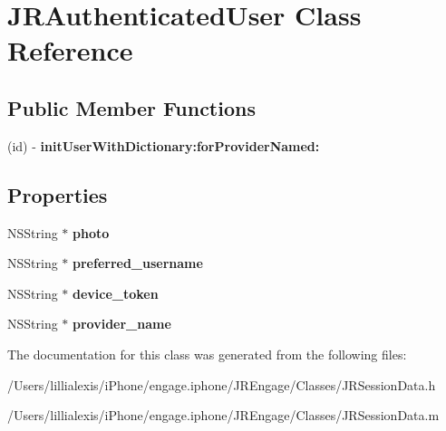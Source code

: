 \hypertarget{interface_j_r_authenticated_user}{
\section{JRAuthenticatedUser Class Reference}
\label{interface_j_r_authenticated_user}
}
\subsection*{Public Member Functions}
\begin{DoxyCompactItemize}
\item 
\hypertarget{interface_j_r_authenticated_user_ae3453286f727aeb869cedf7f1c6e9e48}{
(id) -\/ {\bfseries initUserWithDictionary:forProviderNamed:}}
\label{interface_j_r_authenticated_user_ae3453286f727aeb869cedf7f1c6e9e48}

\end{DoxyCompactItemize}
\subsection*{Properties}
\begin{DoxyCompactItemize}
\item 
\hypertarget{interface_j_r_authenticated_user_a2d69ac2a2164cbfeb74101f102f98fb5}{
NSString $\ast$ {\bfseries photo}}
\label{interface_j_r_authenticated_user_a2d69ac2a2164cbfeb74101f102f98fb5}

\item 
\hypertarget{interface_j_r_authenticated_user_a1dc9a300eff04918b4c8dbdc3624b38f}{
NSString $\ast$ {\bfseries preferred\_\-username}}
\label{interface_j_r_authenticated_user_a1dc9a300eff04918b4c8dbdc3624b38f}

\item 
\hypertarget{interface_j_r_authenticated_user_a50b8e66aa2e508b0a77d4672306757b2}{
NSString $\ast$ {\bfseries device\_\-token}}
\label{interface_j_r_authenticated_user_a50b8e66aa2e508b0a77d4672306757b2}

\item 
\hypertarget{interface_j_r_authenticated_user_a165f8cd8e1ac8e4a72fcf5c7d7f234ac}{
NSString $\ast$ {\bfseries provider\_\-name}}
\label{interface_j_r_authenticated_user_a165f8cd8e1ac8e4a72fcf5c7d7f234ac}

\end{DoxyCompactItemize}


The documentation for this class was generated from the following files:\begin{DoxyCompactItemize}
\item 
/Users/lillialexis/iPhone/engage.iphone/JREngage/Classes/JRSessionData.h\item 
/Users/lillialexis/iPhone/engage.iphone/JREngage/Classes/JRSessionData.m\end{DoxyCompactItemize}
